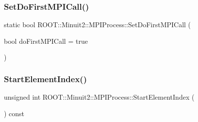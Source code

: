 \subsubsection{\texorpdfstring{SetDoFirstMPICall()}{SetDoFirstMPICall()}\hspace{0.1cm}{\footnotesize\ttfamily [2/2]}}
{\footnotesize\ttfamily static bool R\+O\+O\+T\+::\+Minuit2\+::\+M\+P\+I\+Process\+::\+Set\+Do\+First\+M\+P\+I\+Call (\begin{DoxyParamCaption}\item[{bool}]{do\+First\+M\+P\+I\+Call = {\ttfamily true} }\end{DoxyParamCaption})\hspace{0.3cm}{\ttfamily [static]}}

\mbox{\label{classROOT_1_1Minuit2_1_1MPIProcess_a9e6b2dc6f57cc91bb11637b50ba15957}} 
\subsubsection{\texorpdfstring{StartElementIndex()}{StartElementIndex()}\hspace{0.1cm}{\footnotesize\ttfamily [1/2]}}
{\footnotesize\ttfamily unsigned int R\+O\+O\+T\+::\+Minuit2\+::\+M\+P\+I\+Process\+::\+Start\+Element\+Index (\begin{DoxyParamCaption}{ }\end{DoxyParamCaption}) const\hspace{0.3cm}{\ttfamily [inline]}}

